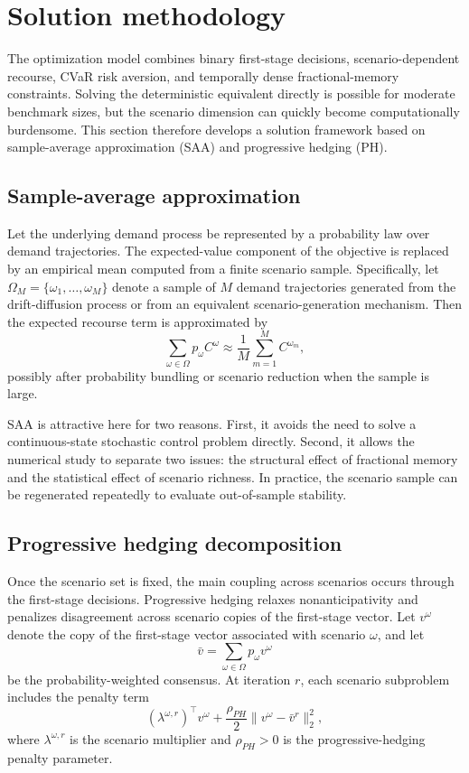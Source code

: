 \section{Solution methodology}
The optimization model combines binary first-stage decisions, scenario-dependent recourse, CVaR risk aversion, and temporally dense fractional-memory constraints. Solving the deterministic equivalent directly is possible for moderate benchmark sizes, but the scenario dimension can quickly become computationally burdensome. This section therefore develops a solution framework based on sample-average approximation (SAA) and progressive hedging (PH).

\subsection{Sample-average approximation}
Let the underlying demand process be represented by a probability law over demand trajectories. The expected-value component of the objective is replaced by an empirical mean computed from a finite scenario sample. Specifically, let $\Omega_M=\{\omega_1,\dots,\omega_M\}$ denote a sample of $M$ demand trajectories generated from the drift-diffusion process or from an equivalent scenario-generation mechanism. Then the expected recourse term is approximated by
\begin{equation}
\sum_{\omega\in\Omega}p_{\omega} C^{\omega}
\approx \frac{1}{M}\sum_{m=1}^{M} C^{\omega_m},
\end{equation}
possibly after probability bundling or scenario reduction when the sample is large.

SAA is attractive here for two reasons. First, it avoids the need to solve a continuous-state stochastic control problem directly. Second, it allows the numerical study to separate two issues: the structural effect of fractional memory and the statistical effect of scenario richness. In practice, the scenario sample can be regenerated repeatedly to evaluate out-of-sample stability.

\subsection{Progressive hedging decomposition}
Once the scenario set is fixed, the main coupling across scenarios occurs through the first-stage decisions. Progressive hedging relaxes nonanticipativity and penalizes disagreement across scenario copies of the first-stage vector. Let $v^{\omega}$ denote the copy of the first-stage vector associated with scenario $\omega$, and let
\begin{equation}
\bar v=\sum_{\omega\in\Omega} p_{\omega} v^{\omega}
\end{equation}
be the probability-weighted consensus. At iteration $r$, each scenario subproblem includes the penalty term
\begin{equation}
 (\lambda^{\omega,r})^{\top}v^{\omega}+\frac{\rho_{PH}}{2}\|v^{\omega}-\bar v^r\|_2^2,
\end{equation}
where $\lambda^{\omega,r}$ is the scenario multiplier and $\rho_{PH}>0$ is the progressive-hedging penalty parameter.

